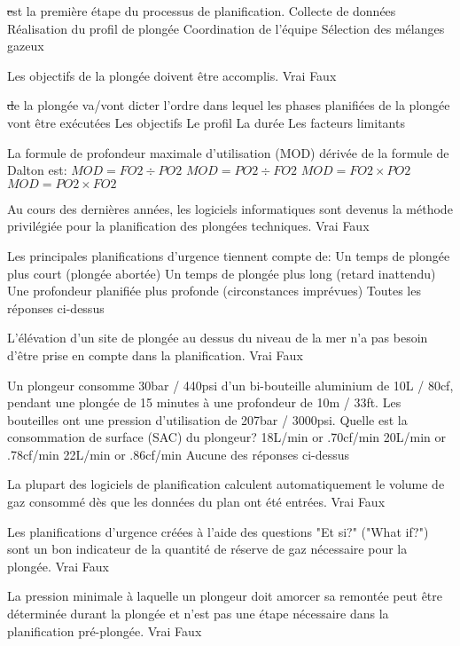 \documentclass[english,10pt,a4paper,twoside]{article}
\begin{document}
	\begin{outline}
		\1 \st est la première étape du processus de planification.
			\2 Collecte de données
			\2 Réalisation du profil de plongée
			\2 Coordination de l'équipe
			\2 Sélection des mélanges gazeux 

		\1 Les objectifs de la plongée doivent être accomplis.
			\2 Vrai
			\2 Faux

		\1 \st de la plongée va/vont dicter l'ordre dans lequel les phases planifiées de la plongée vont être exécutées
			\2 Les objectifs
			\2 Le profil
			\2 La durée
			\2 Les facteurs limitants

		\1 La formule de profondeur maximale d'utilisation (MOD) dérivée de la formule de Dalton est:
			\2 $MOD=FO2 \div PO2$
			\2 $MOD=PO2 \div FO2$
			\2 $MOD=FO2 \times PO2$
			\2 $MOD=PO2 \times FO2$

		\1 Au cours des dernières années, les logiciels informatiques sont devenus la méthode privilégiée pour la planification des plongées techniques.
			\2 Vrai
			\2 Faux

		\1 Les principales planifications d'urgence tiennent compte de:
			\2 Un temps de plongée plus court (plongée abortée)
			\2 Un temps de plongée plus long (retard inattendu)
			\2 Une profondeur planifiée plus profonde (circonstances imprévues)
			\2 Toutes les réponses ci-dessus

		\1 L'élévation d'un site de plongée au dessus du niveau de la mer n'a pas besoin d'être prise en compte dans la planification.
			\2 Vrai
			\2 Faux

		\1 Un plongeur consomme 30bar / 440psi d'un bi-bouteille aluminium de 10L / 80cf, pendant une plongée de 15 minutes à une profondeur de 10m / 33ft. Les bouteilles ont une pression d'utilisation de 207bar / 3000psi. Quelle est la consommation de surface (SAC) du plongeur?
			\2 18L/min or .70cf/min
			\2 20L/min or .78cf/min
			\2 22L/min or .86cf/min
			\2 Aucune des réponses ci-dessus

		\1 La plupart des logiciels de planification calculent automatiquement le volume de gaz consommé dès que les données du plan ont été entrées.
			\2 Vrai
			\2 Faux

		\1 Les planifications d'urgence créées à l'aide des questions "Et si?" ("What if?") sont un bon indicateur de la quantité de réserve de gaz nécessaire pour la plongée. 
			\2 Vrai
			\2 Faux

		\1 La pression minimale à laquelle un plongeur doit amorcer sa remontée peut être déterminée durant la plongée et n'est pas une étape nécessaire dans la planification pré-plongée.
			\2 Vrai
			\2 Faux


\end{outline}
\end{document}
